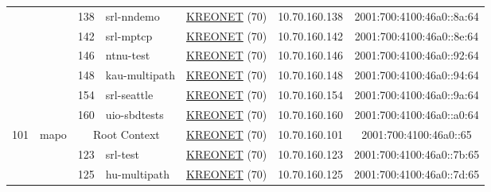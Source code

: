 \begin{small}
\begin{center}
\begin{longtable}{|c|c|c|c|c|c|c|c|}
  &  & \tiny{138} & \multicolumn{1}{|l|}{\tiny{srl-nndemo}} & \multicolumn{2}{|c|}{\tiny{\href{http://www.kreonet.net}{KREONET} (70)}} & \tiny{10.70.160.138} & \tiny{2001:700:4100:46a0::8a:64} \\* \cline{3-3}\cline{4-4}\cline{5-5}\cline{6-6}\cline{7-7}\cline{8-8}
  &  & \tiny{142} & \multicolumn{1}{|l|}{\tiny{srl-mptcp}} & \multicolumn{2}{|c|}{\tiny{\href{http://www.kreonet.net}{KREONET} (70)}} & \tiny{10.70.160.142} & \tiny{2001:700:4100:46a0::8e:64} \\* \cline{3-3}\cline{4-4}\cline{5-5}\cline{6-6}\cline{7-7}\cline{8-8}
  &  & \tiny{146} & \multicolumn{1}{|l|}{\tiny{ntnu-test}} & \multicolumn{2}{|c|}{\tiny{\href{http://www.kreonet.net}{KREONET} (70)}} & \tiny{10.70.160.146} & \tiny{2001:700:4100:46a0::92:64} \\* \cline{3-3}\cline{4-4}\cline{5-5}\cline{6-6}\cline{7-7}\cline{8-8}
  &  & \tiny{148} & \multicolumn{1}{|l|}{\tiny{kau-multipath}} & \multicolumn{2}{|c|}{\tiny{\href{http://www.kreonet.net}{KREONET} (70)}} & \tiny{10.70.160.148} & \tiny{2001:700:4100:46a0::94:64} \\* \cline{3-3}\cline{4-4}\cline{5-5}\cline{6-6}\cline{7-7}\cline{8-8}
  &  & \tiny{154} & \multicolumn{1}{|l|}{\tiny{srl-seattle}} & \multicolumn{2}{|c|}{\tiny{\href{http://www.kreonet.net}{KREONET} (70)}} & \tiny{10.70.160.154} & \tiny{2001:700:4100:46a0::9a:64} \\* \cline{3-3}\cline{4-4}\cline{5-5}\cline{6-6}\cline{7-7}\cline{8-8}
  &  & \tiny{160} & \multicolumn{1}{|l|}{\tiny{uio-sbdtests}} & \multicolumn{2}{|c|}{\tiny{\href{http://www.kreonet.net}{KREONET} (70)}} & \tiny{10.70.160.160} & \tiny{2001:700:4100:46a0::a0:64} \\ \hline
 \multirow{14}{*}{\tiny{101}} & \multicolumn{1}{|l|}{\multirow{14}{*}{\tiny{mapo}}} & \multicolumn{2}{|c|}{\tiny{Root Context}} & \multicolumn{2}{|c|}{\tiny{\href{http://www.kreonet.net}{KREONET} (70)}} & \tiny{10.70.160.101} & \tiny{2001:700:4100:46a0::65} \\* \cline{3-3}\cline{4-4}\cline{5-5}\cline{6-6}\cline{7-7}\cline{8-8}
  &  & \tiny{123} & \multicolumn{1}{|l|}{\tiny{srl-test}} & \multicolumn{2}{|c|}{\tiny{\href{http://www.kreonet.net}{KREONET} (70)}} & \tiny{10.70.160.123} & \tiny{2001:700:4100:46a0::7b:65} \\* \cline{3-3}\cline{4-4}\cline{5-5}\cline{6-6}\cline{7-7}\cline{8-8}
  &  & \tiny{125} & \multicolumn{1}{|l|}{\tiny{hu-multipath}} & \multicolumn{2}{|c|}{\tiny{\href{http://www.kreonet.net}{KREONET} (70)}} & \tiny{10.70.160.125} & \tiny{2001:700:4100:46a0::7d:65} \\* \cline{3-3}\cline{4-4}\cline{5-5}\cline{6-6}\cline{7-7}\cline{8-8}

\end{longtable}
\end{center}
\end{small}

